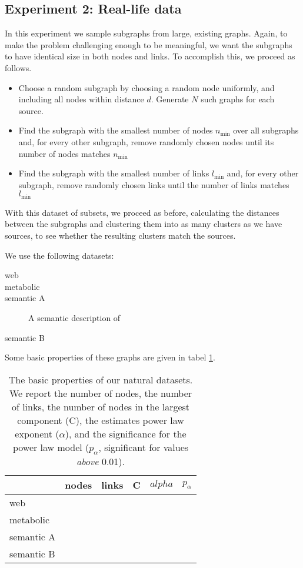 \documentclass[10pt,a4paper,oneside]{article}
\begin{document}
\subsection*{Experiment 2: Real-life data} 

In this experiment we sample subgraphs from large, existing graphs. Again, to make the problem challenging enough to be meaningful, we want the subgraphs to have identical size in both nodes and links. To accomplish this, we proceed as follows.

\begin{itemize}
  \item Choose a random subgraph by choosing a random node uniformly, and including all nodes within distance $d$. Generate $N$ such graphs for each source.
  \item Find the subgraph with the smallest number of nodes $n_{\mbox{min}}$ over all subgraphs and, for every other subgraph, remove randomly chosen nodes until its number of nodes matches $n_{\mbox{min}}$
  \item Find the subgraph with the smallest number of links $l_{\mbox{min}}$ and, for every other subgraph, remove randomly chosen links until the number of links matches $l_{\mbox{min}}$ 
\end{itemize} 

With this dataset of subsets, we proceed as before, calculating the distances between the subgraphs and clustering them into as many clusters as we have sources, to see whether the resulting clusters match the sources.

We use the following datasets:
\begin{description}
	\item[web]
	\item[metabolic] 
	\item[semantic A] A semantic description of 
	\item[semantic B]
\end{description}

Some basic properties of these graphs are given in tabel \ref{table:properties}.

\begin{table}
\label{table:properties}
\begin{tabular}{ l | r r r r r}
\hline
    & nodes & links & C & $alpha$ & $p_\alpha$ \\
\hline
  web & & & & & \\
  metabolic & & & & & \\
  semantic A & & & & & \\
  semantic B & & & & & \\
  
\hline
\end{tabular}
\caption{The basic properties of our natural datasets. We report the number of nodes, the number of links, the number of nodes in the largest component (C), the estimates power law exponent ($\alpha$), and the significance for the power law model ($p_\alpha$, significant for values \emph{above} 0.01).}

\end{table}
\end{document}
